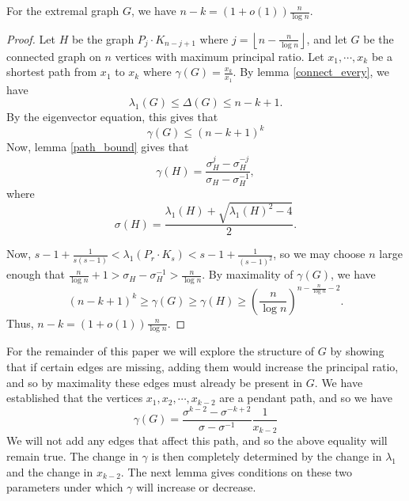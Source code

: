 \begin{lemma}\label{s_range}
For the extremal graph $G$, we have $n-k = (1+o(1))\frac{n}{\log n}$.
\end{lemma}
\begin{proof}
Let $H$ be the graph $P_j \cdot K_{n-j+1}$ where $ j = \left\lfloor n - \frac{n}{\log n}\right\rfloor$, and let $G$ be the connected graph on $n$ vertices with maximum principal ratio. Let $x_1,\cdots, x_k$ be a shortest path from $x_1$ to $x_k$ where $\gamma(G) = \frac{x_k}{x_1}$. By lemma \ref{connect_every}, we have
\[
\lambda_1(G) \leq \Delta(G) \leq n-k+1.
\]
By the eigenvector equation, this gives that
\begin{equation}\label{gamma of G}
\gamma(G) \leq (n-k+1)^k
\end{equation}
Now, lemma \ref{path_bound} gives that
\[
\gamma(H)  = \frac{\sigma_H^j - \sigma_H^{-j}}{\sigma_H - \sigma_H^{-1}},
\]
where
\[
\sigma(H) = \frac{\lambda_1(H) + \sqrt{\lambda_1(H)^2 -4}}{2}.
\]

Now, $s-1 + \frac{1}{s(s-1)} < \lambda_1(P_r\cdot K_s) < s-1 + \frac{1}{(s-1)^2}$, so we may choose $n$ large enough that $\frac{n}{\log n} + 1 >\sigma_H - \sigma_H^{-1} > \frac{n}{\log n}$. By maximality of $\gamma(G)$, we have
\[
(n-k+1)^k \geq \gamma(G) \geq \gamma(H) \geq \left(\frac{n}{\log n}\right)^{n-\frac{n}{\log n} - 2}.
\]
Thus, $n- k = (1+o(1))\frac{n}{\log n}$.
\end{proof}

For the remainder of this paper we will explore the structure of $G$ by
showing that if certain edges are missing, adding them would increase
the principal ratio, and so by maximality these edges must already be
present in $G$.  We have established that the vertices $x_1, x_2, \cdots, x_{k-2}$
are a pendant path, and so we have
\begin{equation}\label{pr_form}
 \gamma(G) = \frac{\sigma^{k-2} - \sigma^{-k+2}}{\sigma-\sigma^{-1}} \frac{1}{x_{k-2}}
\end{equation}
We will not add any edges that affect this path, and so the above equality will
remain true.   
The change in $\gamma$ is then completely determined by the change
in $\lambda_1$ and the change in $x_{k-2}$.  The next lemma gives conditions
on these two parameters under which $\gamma$ will increase or decrease.

